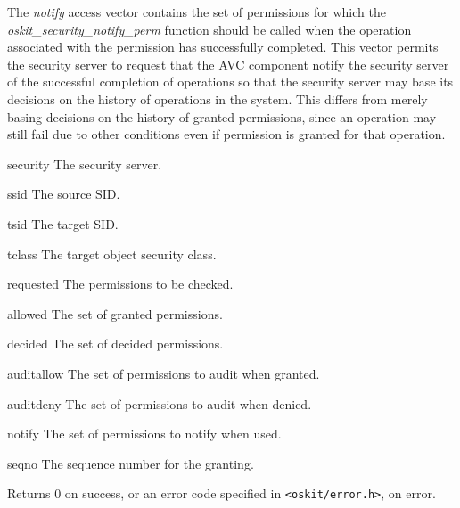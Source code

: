 \begin{apidesc}
The \emph{notify} access vector
contains the set of permissions for which the
\emph{oskit\_security\_notify\_perm} function should be called when the
operation associated with the permission has successfully completed.
This vector permits the security server to request that the AVC
component notify the security server of the successful completion of
operations so that the security server may base its decisions on the
history of operations in the system.  This differs from merely basing
decisions on the history of granted permissions, since an operation
may still fail due to other conditions even if permission is granted
for that operation.  

\end{apidesc}
\begin{apiparm}
	\item[security]
		The security server.
	\item[ssid]
		The source SID.
	\item[tsid]
		The target SID.
	\item[tclass]
		The target object security class.
	\item[requested]
		The permissions to be checked.
	\item[allowed]
		The set of granted permissions.
	\item[decided]
		The set of decided permissions.
	\item[auditallow]
		The set of permissions to audit when granted.
	\item[auditdeny]
		The set of permissions to audit when denied.
	\item[notify]
		The set of permissions to notify when used.
	\item[seqno]
		The sequence number for the granting.
\end{apiparm}
\begin{apiret}
	Returns 0 on success, or an error code specified in
	{\tt <oskit/error.h>}, on error.
\end{apiret}


